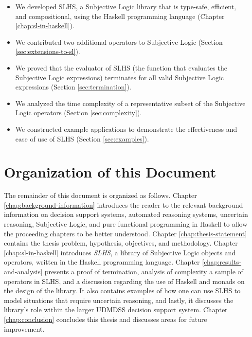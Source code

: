 \documentclass[thesis.tex]{subfiles}
\begin{document}
\begin{itemize}
  \item We developed SLHS, a Subjective Logic library that is type-safe, efficient,
    and compositional, using the Haskell programming language (Chapter \ref{chap:sl-in-haskell}).
  \item We contributed two additional operators to Subjective Logic (Section \ref{sec:extensions-to-sl}).
  \item We proved that the evaluator of SLHS (the function that evaluates the Subjective Logic expressions)
    terminates for all valid Subjective Logic expressions (Section \ref{sec:termination}).
  \item We analyzed the time complexity of a representative subset of the Subjective Logic operators (Section \ref{sec:complexity}).
  \item We constructed example applications to demonstrate the effectiveness and ease of use of SLHS (Section \ref{sec:examples}).
\end{itemize}











\section{Organization of this Document}

The remainder of this document is organized as follows.
Chapter \ref{chap:background-information}
introduces the reader to the relevant background information on decision support systems,
automated reasoning systems, uncertain reasoning, Subjective Logic, and pure functional
programming in Haskell to allow the proceeding
chapters to be better understood. Chapter \ref{chap:thesis-statement} contains the thesis problem, hypothesis, objectives, and methodology.
Chapter \ref{chap:sl-in-haskell} introduces \emph{SLHS}, a library of
Subjective Logic objects and operators, written in the Haskell programming language.
Chapter \ref{chap:results-and-analysis} presents a proof of termination, analysis of complexity a sample of
operators in SLHS, and a discussion regarding the use of Haskell and monads on the design of the library.
It also contains examples of how one can use SLHS to model situations
that require uncertain reasoning, and lastly, it discusses the library's role within the larger UDMDSS decision support system.
Chapter \ref{chap:conclusion} concludes this thesis and discusses areas for future improvement.
\end{document}
